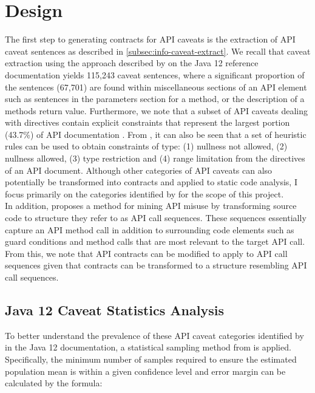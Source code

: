 \section{Design}
\label{sec:contract-design}
The first step to generating contracts for API caveats is the extraction of API caveat sentences as described in \ref{subsec:info-caveat-extract}. We recall that caveat extraction using the approach described by \cite{caveat-knowledge-graph} on the Java 12 reference documentation yields 
115,243 caveat sentences, where a significant proportion of the sentences (67,701) are found within miscellaneous sections of an API element such as sentences in the parameters section for a method, or the description of a methods return value. Furthermore, we note that a subset of API caveats dealing with directives \cite{zhou-directive} contain explicit constraints that represent the largest portion (43.7\%) of API documentation \cite{directives-study}. From \cite{zhou-directive}, it can also be seen that a set of heuristic rules can be used to obtain constraints of type: (1) nullness not allowed, (2) nullness allowed, (3) type restriction and (4) range limitation from the directives of an API document. Although other categories of API caveats can also potentially be transformed into contracts and applied to static code analysis, I focus primarily on the categories identified by \cite{zhou-directive} for the scope of this project. \\

In addition, \cite{code-examples} proposes a method for mining API misuse by transforming source code to structure they refer to as API call sequences. These sequences essentially capture an API method call in addition to surrounding code elements such as guard conditions and method calls that are most relevant to the target API call. From this, we note that API contracts can be modified to apply to API call sequences given that contracts can be transformed to a structure resembling API call sequences.

\subsection{Java 12 Caveat Statistics Analysis}
\label{subsec:contract-caveat-statistics}
To better understand the prevalence of these API caveat categories identified by \cite{zhou-directive} in the Java 12 documentation, a statistical sampling method from \cite{singh2013elements} is applied. Specifically, the minimum number of samples required to ensure the estimated population mean is within a given confidence level and error margin can be calculated by the formula:

